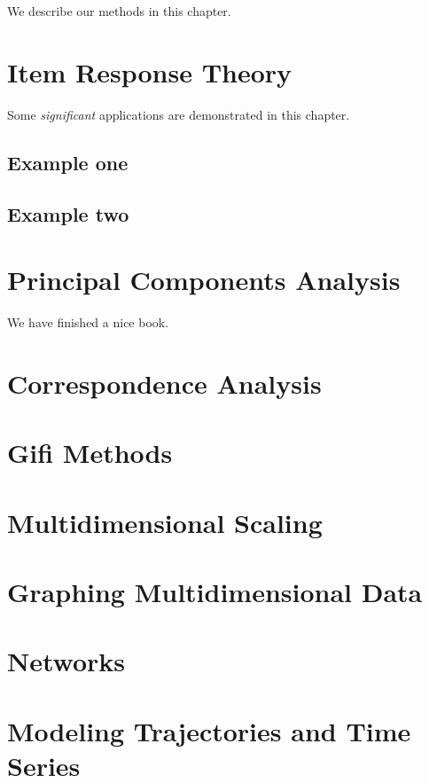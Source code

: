 \documentclass[
]{book}
\begin{document}
We describe our methods in this chapter.

\hypertarget{item-response-theory}{%
\chapter{Item Response Theory}\label{item-response-theory}}

Some \emph{significant} applications are demonstrated in this chapter.

\hypertarget{example-one}{%
\section{Example one}\label{example-one}}

\hypertarget{example-two}{%
\section{Example two}\label{example-two}}

\hypertarget{principal-components-analysis-1}{%
\chapter{Principal Components Analysis}\label{principal-components-analysis-1}}

We have finished a nice book.

\hypertarget{correspondence-analysis}{%
\chapter{Correspondence Analysis}\label{correspondence-analysis}}

\hypertarget{gifi-methods}{%
\chapter{Gifi Methods}\label{gifi-methods}}

\hypertarget{multidimensional-scaling}{%
\chapter{Multidimensional Scaling}\label{multidimensional-scaling}}

\hypertarget{graphing-multidimensional-data}{%
\chapter{Graphing Multidimensional Data}\label{graphing-multidimensional-data}}

\hypertarget{networks}{%
\chapter{Networks}\label{networks}}

\hypertarget{modeling-trajectories-and-time-series}{%
\chapter{Modeling Trajectories and Time Series}\label{modeling-trajectories-and-time-series}}

  
\end{document}
